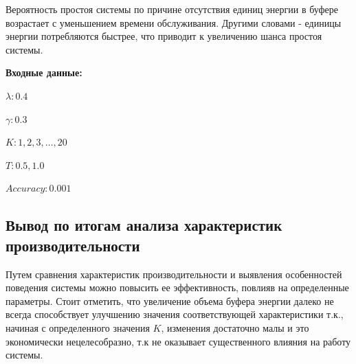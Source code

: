 \documentclass[12pt, a4paper]{article}
\begin{document}
Вероятность простоя системы по причине отсутствия единиц энергии в буфере возрастает с уменьшением времени обслуживания. Другими словами - единицы энергии потребляются быстрее, что приводит к увеличению шанса простоя системы.

\pagebreak
\textbf{Входные данные:}

$\lambda: 0.4$

$\gamma: 0.3$

$K: 1, 2, 3, \ldots, 20$

$T: 0.5, 1.0$

$Accuracy: 0.001$

\begin{figure}[h]
\end{figure}
\pagebreak
\begin{flushleft}\subsection{Вывод по итогам анализа характеристик производительности}\end{flushleft}

Путем сравнения характеристик производительности и выявления особенностей поведения системы можно повысить ее эффективность, повлияв на определенные параметры. Стоит отметить, что увеличение объема буфера энергии далеко не всегда способствует улучшению значения соответствующей характеристики т.к., начиная с определенного значения $K$, изменения достаточно малы и это экономически нецелесобразно, т.к не оказывает существенного влияния на работу системы.
\end{document}
